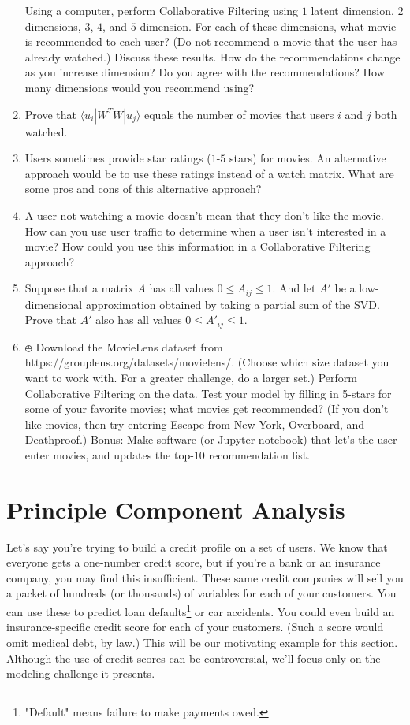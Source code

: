 \documentclass{amsbook}
\begin{document}
\begin{enumerate}
Using a computer, perform Collaborative Filtering using $1$ latent dimension, $2$ dimensions, $3$, $4$, and $5$ dimension.  For each of these dimensions, what movie is recommended to each user?  (Do not recommend a movie that the user has already watched.)  Discuss these results.  How do the recommendations change as you increase dimension?  Do you agree with the recommendations?  How many dimensions would you recommend using?
\item Prove that $\langle u_i|W^TW|u_j\rangle$ equals the number of movies that users $i$ and $j$ both watched.
\item Users sometimes provide star ratings ($1$-$5$ stars) for movies.  An alternative approach would be to use these ratings instead of a watch matrix.  What are some pros and cons of this alternative approach?
\item A user not watching a movie doesn't mean that they don't like the movie.  How can you use user traffic to determine when a user isn't interested in a movie?  How could you use this information in a Collaborative Filtering approach?
\item Suppose that a matrix $A$ has all values $0\leq A_{ij}\leq1$.  And let $A'$ be a low-dimensional approximation obtained by taking a partial sum of the SVD.  Prove that $A'$ also has all values $0\leq A'_{ij}\leq1$.
\item \label{movie_lens_1} $\obot$ Download the MovieLens dataset from https://grouplens.org/datasets/movielens/.  (Choose which size dataset you want to work with.  For a greater challenge, do a larger set.)  Perform Collaborative Filtering on the data.  Test your model by filling in 5-stars for some of your favorite movies; what movies get recommended?  (If you don’t like movies, then try entering Escape from New York, Overboard, and Deathproof.)  Bonus:  Make software (or Jupyter notebook) that let’s the user enter movies, and updates the top-10 recommendation list.
\end{enumerate}

\section{Principle Component Analysis}

Let's say you're trying to build a credit profile on a set of users.  We know that everyone gets a one-number credit score, but if you're a bank or an insurance company, you may find this insufficient.  These same credit companies will sell you a packet of hundreds (or thousands) of variables for each of your customers.  You can use these to predict loan defaults\footnote{"Default" means failure to make payments owed.} or car accidents.  You could even build an insurance-specific credit score for each of your customers.  (Such a score would omit medical debt, by law.)  This will be our motivating example for this section.  Although the use of credit scores can be controversial, we'll focus only on the modeling challenge it presents.
\end{document}
